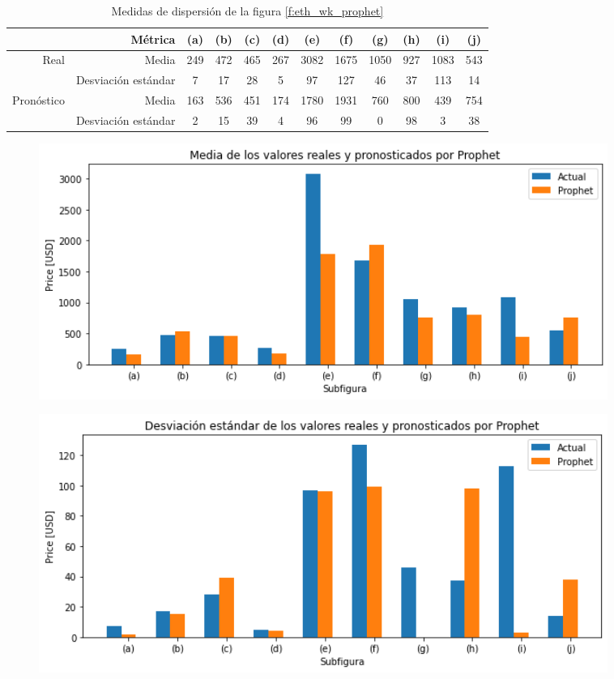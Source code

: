 \documentclass[a4paper,10pt]{article}
\begin{document}
\begin{table}[H]
 \begin{center}
 \resizebox{12cm}{!} {
  \begin{tabular}{|r|r|c|c|c|c|c|c|c|c|c|c|}
    & Métrica & (a) & (b) & (c) & (d) & (e) & (f) & (g) & (h) & (i) & (j) \\ \hline
    Real & Media & 249 & 472 & 465 & 267 & 3082 & 1675 & 1050 & 927 & 1083 & 543 \\
    & Desviación estándar & 7 & 17 & 28 & 5 & 97 & 127 & 46 & 37 & 113 & 14 \\
    Pronóstico & Media & 163 & 536 & 451 & 174 & 1780 & 1931 & 760 & 800 & 439 & 754\\
    & Desviación estándar & 2 & 15 & 39 & 4 & 96 & 99 & 0 & 98 & 3 & 38 \\ \hline
  \end{tabular}
  }
  \caption{Medidas de dispersión de la figura \ref{f:eth_wk_prophet}}
  \label{tab:eth_wk_avestd}
 \end{center}
\end{table}

\begin{figure}[H]
\centering
\includegraphics[width=0.9\textwidth]{./plots/prophet/eth/week/ave}
\label{f:eth_ave_wk}
\end{figure}


\begin{figure}[H]
\centering
\includegraphics[width=0.9\textwidth]{./plots/prophet/eth/week/std}
\label{f:eth_std_wk}
\end{figure}
\end{document}
